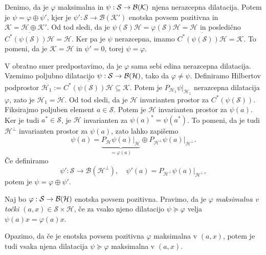 \begin{dokaz}
    Denimo, da je $\varphi$ maksimalna in $\psi: \mathcal{S} \to \operatorname{\mathcal{B} (\mathcal{K})}$ njena nerazcepna dilatacija.
    Potem je $\psi = \varphi \oplus \psi'$,
    kjer je $\psi': \mathcal{S} \to \mathcal{B}(\mathcal{K}')$ enotska povsem pozitivna in $\mathcal{K} = \mathcal{H} \oplus \mathcal{K}'$.
    Od tod sledi, da je $\psi (\mathcal{S}) \mathcal{H} = \varphi(\mathcal{S}) \mathcal{H} = \mathcal{H}$ in posledično 
    $\overline{C^* (\psi(\mathcal{S})) \mathcal{H}} = \mathcal{H}$.
    Ker pa je $\psi$ nerazcepna, imamo $\overline{C^* (\psi(\mathcal{S})) \mathcal{H}} = \mathcal{K}$. To pomeni, da je $\mathcal{K} = \mathcal{H}$
    in $\psi' = 0$, torej $\psi = \varphi$.
    
    V obratno smer predpostavimo, da je $\varphi$ sama sebi edina nerazcepna dilatacija.
    Vzemimo poljubno dilatacijo $\psi : \mathcal{S} \to \operatorname{\mathcal{B} (\mathcal{H})}$, tako da $\varphi \neq \psi$.
    Definiramo Hilbertov podprostor $\mathcal{H}_1 := \overline{C^* (\psi (\mathcal{S})) \mathcal{H}}  \subseteq \mathcal{K}$.
    Potem je
    $P_{\mathcal{H}_1} \psi |_{\mathcal{H}_1}$ nerazcepna dilatacija $\varphi$, zato je $\mathcal{H}_1 = \mathcal{H}$.
    Od tod sledi, da je $\mathcal{H}$ invarianten prostor za $C^* (\psi (\mathcal{S}))$. 
    Fiksirajmo poljuben element $a \in \mathcal{S}$.
    Potem je $\mathcal{H}$ invarianten prostor za $\psi (a)$.
    Ker je tudi $a^* \in \mathcal{S}$, je $\mathcal{H}$ invarianten za $\psi (a)^* = \psi(a^*)$.
    To pomeni, da je tudi $\mathcal{H}^\perp$ invarianten prostor za $\psi (a)$,
    zato lahko zapišemo 
    $$\psi (a) = \underbrace{P_{\mathcal{H}} \psi (a) |_{\mathcal{H}}}_{= \varphi (a)} \oplus P_{\mathcal{H}^\perp} \psi (a) |_{\mathcal{H}^\perp}.$$
    Če definiramo $$\psi': \mathcal{S} \to \mathcal{B}(\mathcal{H}^\perp),\quad \psi' (a) = P_{\mathcal{H}^\perp} \psi (a) |_{\mathcal{H}^\perp},$$
    potem je $\psi = \varphi \oplus \psi'$.
\end{dokaz}

\begin{definicija}
    Naj bo $\varphi: \mathcal{S} \to \operatorname{\mathcal{B} (\mathcal{H})}$ enotska povsem pozitivna.
    Pravimo, da je $\varphi$ \emph{maksimalna v točki $(a, x) \in \mathcal{S} \times \mathcal{H}$}, če za vsako njeno dilatacijo $\psi \succeq \varphi$
    velja $\psi (a) x = \varphi(a) x.$        
\end{definicija}

\begin{opomba}
    Opazimo, da če je enotska povsem pozitivna $\varphi$ maksimalna v $(a, x)$, potem je tudi vsaka njena dilatacija $\psi \succeq \varphi$
    maksimalna v $(a, x)$.
\end{opomba}

